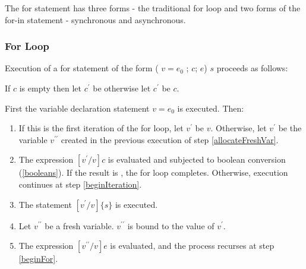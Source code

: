 \documentclass{article}
\newcommand{\code}[1]{{\sf #1}}
\begin{document}
\LMHash{}
 The for statement has three forms - the traditional for loop and two forms of the for-in statement - synchronous and asynchronous.

\subsubsection{For Loop}


\LMHash{}
Execution of a for statement of the form   \code{ \FOR{} (\VAR{} $v = e_0$ ; $c$; $e$) $s$} proceeds as follows:

\LMHash{}
If $c$ is empty then let $c^\prime$ be \TRUE{} otherwise let  $c^\prime$ be $c$.

\LMHash{}
First the variable declaration statement \VAR{} $v = e_0$ is executed. Then:
\begin{enumerate}
\item
\label{beginFor}
If this is the first iteration of the for loop, let $v^\prime$ be $v$. Otherwise,  let $v^\prime$ be the variable $v^{\prime\prime}$ created in the previous execution of step \ref{allocateFreshVar}.
\item
The expression $[v^\prime/v]c$ is evaluated and subjected to boolean conversion (\ref{booleans}). If the result is \FALSE{}, the for loop completes. Otherwise, execution continues at step    
\ref{beginIteration}.
\item
\label{beginIteration}
The statement $[v^\prime/v]\{s\}$ is executed.
\item
\label{allocateFreshVar}
Let $v^{\prime\prime}$ be a fresh variable.  $v^{\prime\prime}$ is bound to the value of $v^\prime$.
\item
The expression $[v^{\prime\prime}/v]e$ is evaluated, and the process recurses at step
  \ref{beginFor}.
\end{enumerate}

\end{document}
